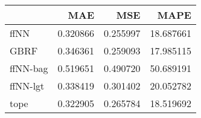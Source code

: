 \begin{tabular}{lrrr}
\toprule
{} &       MAE &       MSE &       MAPE \\
\midrule
ffNN     &  0.320866 &  0.255997 &  18.687661 \\
GBRF     &  0.346361 &  0.259093 &  17.985115 \\
ffNN-bag &  0.519651 &  0.490720 &  50.689191 \\
ffNN-lgt &  0.338419 &  0.301402 &  20.052782 \\
tope     &  0.322905 &  0.265784 &  18.519692 \\
\bottomrule
\end{tabular}
